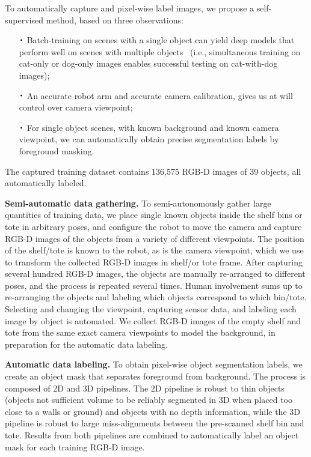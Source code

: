 \documentclass[letterpaper, 10 pt, conference]{ieeeconf}  %
\newcommand*{\Cdot}{\raisebox{-0.25ex}{\scalebox{1.75}{$\cdot$}}}
\newcommand{\myparagraph}[1]{\vspace{0.1in}\noindent\textbf{#1}}
\begin{document}
To automatically capture and pixel-wise label images, we propose a self-supervised method, based on three observations: 
\begin{itemize}
\item[$\Cdot$] Batch-training on scenes with a single object can yield deep models that perform well on scenes with multiple objects~\cite{girshick2014rich} (i.e., simultaneous training on cat-only or dog-only images enables successful testing on cat-with-dog images); 
\item[$\Cdot$] An accurate robot arm and accurate camera calibration, gives us at will control over camera viewpoint;
\item[$\Cdot$] For single object scenes, with known background and known camera viewpoint, we can automatically obtain precise segmentation labels by foreground masking.
\end{itemize}
The captured training dataset contains 136,575 RGB-D images of 39 objects, all automatically labeled.

\myparagraph{Semi-automatic data gathering.} To semi-autonomously gather large quantities of training data, we place single known objects inside the shelf bins or tote in arbitrary poses, and configure the robot to move the camera and capture RGB-D images of the objects from a variety of different viewpoints.
The position of the shelf/tote is known to the robot, as is the camera viewpoint, which we use to transform the collected RGB-D images in shelf/or tote frame.
After capturing several hundred RGB-D images, the objects are manually re-arranged to different poses, and the process is repeated several times. 
Human involvement sums up to re-arranging the objects and labeling which objects correspond to which bin/tote. 
Selecting and changing the viewpoint, capturing sensor data, and labeling each image by object is automated.
We collect RGB-D images of the empty shelf and tote from the same exact camera viewpoints to model the background, in preparation for the automatic data labeling. 


\myparagraph{Automatic data labeling.} To obtain pixel-wise object segmentation labels, we create an object mask that separates foreground from background. The process is composed of 2D and 3D pipelines. The 2D pipeline is robust to thin objects (objects not sufficient volume to be reliably segmented in 3D when placed too close to a walls or ground) and objects with no depth information, while the 3D pipeline is robust to large miss-alignments between the pre-scanned shelf bin and tote. Results from both pipelines are combined to automatically label an object mask for each training RGB-D image.
\end{document}
